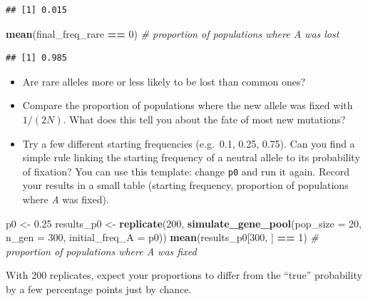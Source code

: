 \documentclass[
  a4paper]{book}
\newenvironment{Shaded}{\begin{snugshade}}{\end{snugshade}}
\newcommand{\AttributeTok}[1]{\textcolor[rgb]{0.13,0.29,0.53}{#1}}
\newcommand{\CommentTok}[1]{\textcolor[rgb]{0.56,0.35,0.01}{\textit{#1}}}
\newcommand{\DecValTok}[1]{\textcolor[rgb]{0.00,0.00,0.81}{#1}}
\newcommand{\FloatTok}[1]{\textcolor[rgb]{0.00,0.00,0.81}{#1}}
\newcommand{\FunctionTok}[1]{\textcolor[rgb]{0.13,0.29,0.53}{\textbf{#1}}}
\newcommand{\NormalTok}[1]{#1}
\newcommand{\OtherTok}[1]{\textcolor[rgb]{0.56,0.35,0.01}{#1}}
\newcommand{\SpecialCharTok}[1]{\textcolor[rgb]{0.81,0.36,0.00}{\textbf{#1}}}
\providecommand{\tightlist}{%
  \setlength{\itemsep}{0pt}\setlength{\parskip}{0pt}}
\begin{document}
\begin{verbatim}
## [1] 0.015
\end{verbatim}

\begin{Shaded}
\begin{Highlighting}[]
\FunctionTok{mean}\NormalTok{(final\_freq\_rare }\SpecialCharTok{==} \DecValTok{0}\NormalTok{)   }\CommentTok{\# proportion of populations where A was lost}
\end{Highlighting}
\end{Shaded}

\begin{verbatim}
## [1] 0.985
\end{verbatim}

\begin{itemize}
\tightlist
\item
  Are rare alleles more or less likely to be lost than common ones?
\item
  Compare the proportion of populations where the new allele was fixed with \(1/(2N)\). What does this tell you about the fate of most new mutations?
\item
  Try a few different starting frequencies (e.g.~0.1, 0.25, 0.75). Can you find a simple rule linking the starting frequency of a neutral allele to its probability of fixation? You can use this template: change \texttt{p0} and run it again. Record your results in a small table (starting frequency, proportion of populations where \emph{A} was fixed).
\end{itemize}

\begin{Shaded}
\begin{Highlighting}[]
\NormalTok{p0 }\OtherTok{\textless{}{-}} \FloatTok{0.25}
\NormalTok{results\_p0 }\OtherTok{\textless{}{-}} \FunctionTok{replicate}\NormalTok{(}\DecValTok{200}\NormalTok{, }\FunctionTok{simulate\_gene\_pool}\NormalTok{(}\AttributeTok{pop\_size =} \DecValTok{20}\NormalTok{, }\AttributeTok{n\_gen =} \DecValTok{300}\NormalTok{,}
                                                \AttributeTok{initial\_freq\_A =}\NormalTok{ p0))}
\FunctionTok{mean}\NormalTok{(results\_p0[}\DecValTok{300}\NormalTok{, ] }\SpecialCharTok{==} \DecValTok{1}\NormalTok{)   }\CommentTok{\# proportion of populations where A was fixed}
\end{Highlighting}
\end{Shaded}

With 200 replicates, expect your proportions to differ from the ``true'' probability by a few percentage points just by chance.
\end{document}
